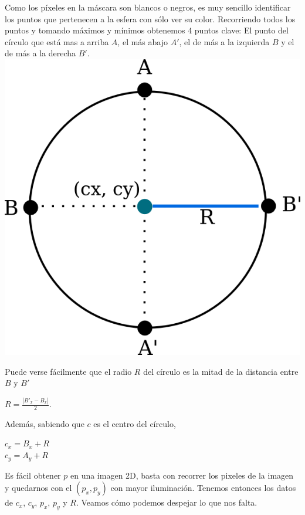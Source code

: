 Como los píxeles en la máscara son blancos o negros, es muy sencillo identificar los puntos que pertenecen a la esfera con sólo ver su color. Recorriendo todos los puntos y tomando máximos y mínimos obtenemos 4 puntos clave: El punto del círculo que está mas a arriba $A$, el más abajo $A'$, el de más a la izquierda $B$ y el de más a la derecha $B'$. \\

{\centering
    \includegraphics[scale=0.5]{informe/imagenes/esfera/circulo.png} \\
}

Puede verse fácilmente que el radio $R$ del círculo es la mitad de la distancia entre $B$ y $B'$

\begin{center}
$R = \frac{|B'_x - B_x|}{2}$.
\end{center}

Además, sabiendo que $c$ es el centro del círculo,

\begin{center}
    $c_{x} = B_x + R$ \\
    $c_{y} = A_y + R$
\end{center}

Es fácil obtener $p$ en una imagen 2D, basta con recorrer los pixeles de la imagen y quedarnos con el $(p_x, p_y)$ con mayor iluminación. Tenemos entonces los datos de $c_x$, $c_y$, $p_x$, $p_y$ y $R$. Veamos cómo podemos despejar lo que nos falta. \\

